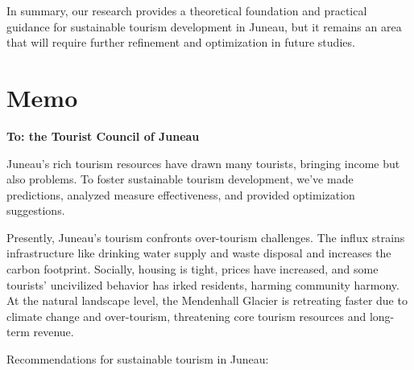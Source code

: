 \documentclass{mcmthesis}
\begin{document}
{In summary, our research provides a theoretical foundation and practical guidance for sustainable tourism development in Juneau, but it remains an area that will require further refinement and optimization in future studies.}

\newpage
\section{Memo}
\textbf{To: the Tourist Council of Juneau}

{Juneau's rich tourism resources have drawn many tourists, bringing income but also problems. To foster sustainable tourism development, we've made predictions, analyzed measure effectiveness, and provided optimization suggestions.}

{Presently, Juneau's tourism confronts over-tourism challenges. The influx strains infrastructure like drinking water supply and waste disposal and increases the carbon footprint. Socially, housing is tight, prices have increased, and some tourists' uncivilized behavior has irked residents, harming community harmony. At the natural landscape level, the Mendenhall Glacier is retreating faster due to climate change and over-tourism, threatening core tourism resources and long-term revenue.}

{Recommendations for sustainable tourism in Juneau:}
\end{document}
